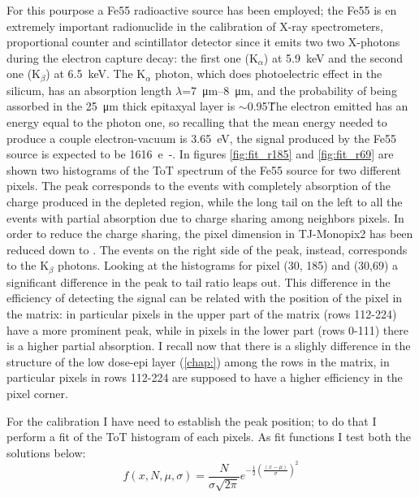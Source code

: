         For this pourpose a Fe55 radioactive source has been employed; the Fe55 is en extremely important radionuclide in the calibration of X-ray spectrometers, proportional counter and scintillator detector since it emits two two X-photons during the electron capture decay: the first one (K$_\alpha$) at \SI{5.9}{keV} and the second one (K$_\beta$) at \SI{6.5}{keV}.
        The K$_\alpha$ photon, which does photoelectric effect in the silicum, has an absorption length $\lambda$=\SIrange{7}{8}{\um}, and the probability of being assorbed in the \SI{25}{\um} thick epitaxyal layer is $\sim$0.95\.
        The electron emitted has an energy equal to the photon one, so recalling that the mean energy needed to produce a couple electron-vacuum is \SI{3.65}{eV}, the signal produced by the Fe55 source is expected to be \SI{1616}{e-}.
        In figures \ref{fig:fit_r185} and \ref{fig:fit_r69} are shown two histograms of the ToT spectrum of the Fe55 source for two different pixels. The peak corresponds to the events with completely absorption of the charge produced in the depleted region, while the long tail on the left to all the events with partial absorption due to charge sharing among neighbors pixels. In order to reduce the charge sharing, the pixel dimension in TJ-Monopix2 has been reduced down to . 
        The events on the right side of the peak, instead, corresponds to the K$_{\beta}$ photons. 
        Looking at the histograms for pixel (30, 185) and (30,69) a significant difference in the peak to tail ratio leaps out. 
        This difference in the efficiency of detecting the signal can be related with the position of the pixel in the matrix: in particular pixels in the upper part of the matrix (rows 112-224) have a more prominent peak, while in pixels in the lower part (rows 0-111) there is a higher partial absorption. 
        I recall now that there is a slighly difference in the structure of the low dose-epi layer (\ref{chap:}) among the rows in the matrix, in particular pixels in rows 112-224 are supposed to have a higher efficiency in the pixel corner. 
        
        For the calibration I have need to establish the peak position; to do that I perform a fit of the ToT histogram of each pixels. As fit functions I test both the solutions below:  
        \begin{equation}
            f(x, N, \mu, \sigma) = \frac{N}{\sigma \sqrt{2\pi}} e^{-\frac{1}{2}(\frac{(x-\mu)}{\sigma})^2}
            \label{eq:gauss}
        \end{equation} 

